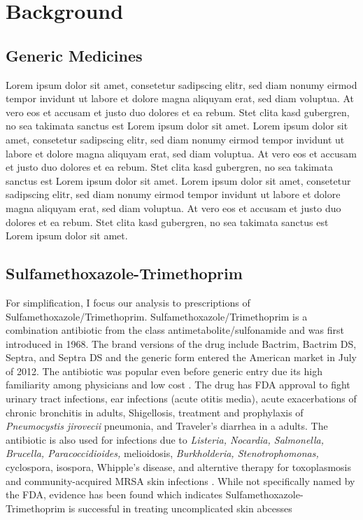 \chapter{Background}

\section{Generic Medicines}
Lorem ipsum dolor sit amet, consetetur sadipscing elitr,  sed diam nonumy eirmod
tempor invidunt ut labore et dolore magna aliquyam erat, sed diam voluptua. At
vero eos et accusam et justo duo dolores et ea rebum. Stet clita kasd gubergren,
no sea takimata sanctus est Lorem ipsum dolor sit amet. Lorem ipsum dolor sit
amet, consetetur sadipscing elitr,  sed diam nonumy eirmod tempor invidunt ut
labore et dolore magna aliquyam erat, sed diam voluptua. At vero eos et accusam
et justo duo dolores et ea rebum. Stet clita kasd gubergren, no sea takimata
sanctus est Lorem ipsum dolor sit amet. Lorem ipsum dolor sit amet, consetetur
sadipscing elitr,  sed diam nonumy eirmod tempor invidunt ut labore et dolore
magna aliquyam erat, sed diam voluptua. At vero eos et accusam et justo duo
dolores et ea rebum. Stet clita kasd gubergren, no sea takimata sanctus est
Lorem ipsum dolor sit amet.

\section{Sulfamethoxazole-Trimethoprim}
\indent For simplification, I focus our analysis to prescriptions of Sulfamethoxazole/Trimethoprim. Sulfamethoxazole/Trimethoprim is a combination antibiotic from the class antimetabolite/sulfonamide and was first introduced in 1968. The brand versions of the drug include Bactrim, Bactrim DS, Septra, and Septra DS and the generic form entered the American market in July of 2012. The antibiotic was popular even before generic entry due its high familiarity among physicians and low cost \cite{noauthor_sulfamethoxazole_nodate,ho_considerations_2011}. The drug has FDA approval to fight urinary tract infections, ear infections (acute otitis media), acute exacerbations of chronic bronchitis in adults, Shigellosis, treatment and prophylaxis of \textit{Pneumocystis jirovecii} pneumonia, and Traveler's diarrhea in a adults. The antibiotic is also used for infections due to \textit{Listeria, Nocardia, Salmonella, Brucella, Paracoccidioides,} melioidosis, \textit{Burkholderia, Stenotrophomonas,} cyclospora, isospora, Whipple's disease, and alterntive therapy for toxoplasmosis and community-acquired MRSA skin infections \cite{schlossberg_antibiotics_2017}. While not specifically named by the FDA, evidence has been found which indicates Sulfamethoxazole-Trimethoprim is successful in treating uncomplicated skin abcesses \cite{noauthor_trimethoprimsulfamethoxazole_nodate}\\

